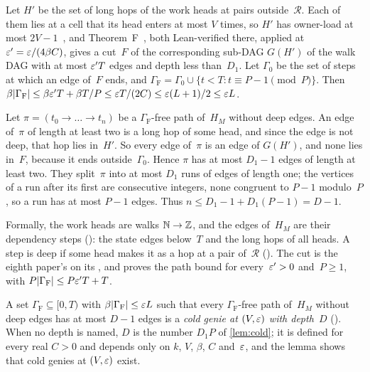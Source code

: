 \begin{outline}
Let $H'$ be the set of long hops of the work heads at pairs outside~$\mathcal R$. Each of them lies at a cell that its
head enters at most $V$ times, so $H'$ has owner-load at most $2V-1$~\cite[Corollary~3.2]{BoundedNesting2026}, and
Theorem~F~\cite[Theorem~3.6]{BoundedNesting2026}, both Lean-verified there, applied at $\varepsilon'=\varepsilon/(4\beta C)$, gives a
cut~$F$ of the corresponding sub-DAG $G(H')$ of the walk DAG with at most $\varepsilon'T$ edges and depth less than~$D_1$. Let
$\Gamma_0$ be the set of steps at which an edge of~$F$ ends, and
$\Gamma_{\mathrm F}=\Gamma_0\cup\{t<T:t\equiv P-1\pmod P\}$. Then
$\beta\lvert \Gamma_{\mathrm F} \rvert\le\beta\varepsilon'T+\beta T/P\le\varepsilon T/(2C)\le\varepsilon(L+1)/2\le\varepsilon L$.

Let $\pi=(t_0\to\dots\to t_n)$ be a $\Gamma_{\mathrm F}$-free path of~$H_M$ without deep edges. An edge of~$\pi$ of
length at least two is a long hop of some head, and since the edge is not deep, that hop lies in~$H'$. So every edge
of~$\pi$ is an edge of $G(H')$, and none lies in~$F$, because it ends outside~$\Gamma_0$. Hence $\pi$ has at most
$D_1-1$ edges of length at least two. They split~$\pi$ into at most $D_1$ runs of edges of length one; the vertices of a
run after its first are consecutive integers, none congruent to $P-1$ modulo~$P$, so a run has at most $P-1$ edges.
Thus $n\le D_1-1+D_1(P-1)=D-1$.

Formally, the work heads are walks $\mathbb{N}\to\mathbb{Z}$, and the edges of~$H_M$ are their dependency steps
(): the state edges below~$T$ and the long hops of all heads. A step is deep if some head makes
it as a hop at a pair of~$\mathcal R$ (). The cut is the eighth paper's
 on its , and  proves the
path bound for every~$\varepsilon'>0$ and~$P\ge1$, with $P\lvert \Gamma_{\mathrm F} \rvert\le P\varepsilon'T+T$.
\end{outline}

A set $\Gamma_{\mathrm F}\subseteq[0,T)$ with $\beta\lvert \Gamma_{\mathrm F} \rvert\le\varepsilon L$ such that every
$\Gamma_{\mathrm F}$-free path of~$H_M$ without deep edges has at most $D-1$ edges is a \emph{cold genie at $(V,\varepsilon)$
with depth~$D$} (). When no depth is named, $D$ is the number $D_1P$ of \cref{lem:cold}; it
is defined for every real $C>0$ and depends only on $k$, $V$, $\beta$, $C$ and~$\varepsilon$, and the lemma shows that cold
genies at $(V,\varepsilon)$ exist.

